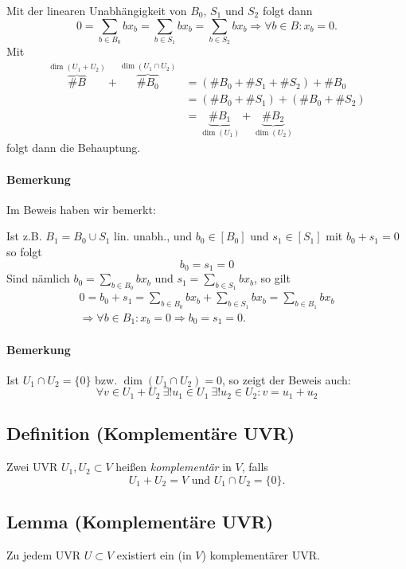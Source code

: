 	Mit der linearen Unabhängigkeit von $ B_0$, $S_1 $ und $ S_2 $ folgt dann
		\[
		0 = \sum_{b\in B_0}bx_b = \sum_{b\in S_1}bx_b = \sum_{b\in S_2}bx_b \Rightarrow \forall b\in B: x_b = 0.
		\]
	Mit
		\begin{align*}
		\overbrace{\#B}^{\dim(U_1+U_2)} + \overbrace{\#B_0}^{\dim(U_1\cap U_2)} &= (\#B_0 + \#S_1 + \#S_2) + \#B_0\\
		&= (\#B_0+\#S_1)+(\#B_0 + \#S_2) \\
		&= \underbrace{\#B_1}_{\dim(U_1)}+\underbrace{\#B_2}_{\dim(U_2)}
		\end{align*}
	folgt dann die Behauptung.

\paragraph{Bemerkung}
	Im Beweis haben wir bemerkt: 
	
	Ist z.B. $ B_1 = B_0\cup S_1 $ lin. unabh., und $ b_0\in [B_0] $ und $ s_1\in [S_1] $ mit $b_0 + s_1 = 0$ so folgt 
	\[b_0 = s_1 = 0 \]
	Sind nämlich $ b_0 = \sum_{b\in B_0} bx_b $ und $ s_1 = \sum_{b\in S_1}bx_b $, so gilt 
		\begin{gather*}
		0 = b_0+s_1 = \sum_{b\in B_0} bx_b+\sum_{b\in S_1} bx_b = \sum_{b\in B_1} bx_b \\ \Rightarrow \forall b\in B_1: x_b = 0\Rightarrow b_0 = s_1 = 0.
		\end{gather*}

\paragraph{Bemerkung}
	Ist $ U_1\cap U_2 = \{0\} $ bzw. $ \dim (U_1\cap U_2)  = 0 $, so zeigt der Beweis auch:
		\[
		\forall v\in U_1+U_2\ \exists ! u_1 \in U_1\ \exists ! u_2\in U_2: v= u_1+u_2
		\]

\subsection{Definition (Komplementäre UVR)}
	\begin{Definition}
		Zwei UVR $ U_1,U_2 \subset V $ heißen \emph{komplementär} in $ V $, falls
		\[
		U_1+U_2=V\text{ und } U_1\cap U_2 = \{0\}.
		\]
	\end{Definition}
		
\subsection{Lemma (Komplementäre UVR)}
	\begin{Lemma}
		Zu jedem UVR $ U\subset V $ existiert ein (in $ V $) komplementärer UVR.
	\end{Lemma}
	
